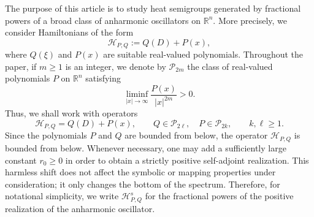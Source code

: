 \documentclass[12pt, reqno]{amsart}
\theoremstyle{definition}
\theoremstyle{remark}
\numberwithin{equation}{section}
\newcommand{\Rn}{{\mathbb{R}}^{n}}
\begin{document}
The purpose of this article is to study heat semigroups generated by fractional powers of a broad class of anharmonic oscillators on $\mathbb{R}^n$. More precisely, we consider Hamiltonians of the form
\[
\mathcal{H}_{P,Q}:=Q(D)+P(x),
\]
where $Q(\xi)$ and $P(x)$ are suitable real-valued polynomials. Throughout the paper, if $m\geq 1$ is an integer, we denote by $\mathcal{P}_{2m}$ the class of real-valued polynomials $P$ on $\Rn$ satisfying
\[
\liminf_{|x|\rightarrow\infty}\frac{P(x)}{|x|^{2m}}>0.
\]
Thus, we shall work with operators
\[
\mathcal{H}_{P,Q}=Q(D)+P(x),
\qquad
Q\in \mathcal{P}_{2\ell},\quad P\in \mathcal{P}_{2k},
\qquad
k,\ell\geq 1.
\]
Since the polynomials $P$ and $Q$ are bounded from below, the operator $\mathcal H_{P,Q}$ is bounded from below. Whenever necessary, one may add a sufficiently large constant $r_0\geq0$ in order to obtain a strictly positive self-adjoint realization. This harmless shift does not affect the symbolic or mapping properties under consideration; it only changes the bottom of the spectrum. Therefore, for notational simplicity, we write $\mathcal H_{P,Q}^s$ for the fractional powers of the positive realization of the anharmonic oscillator.
\end{document}
